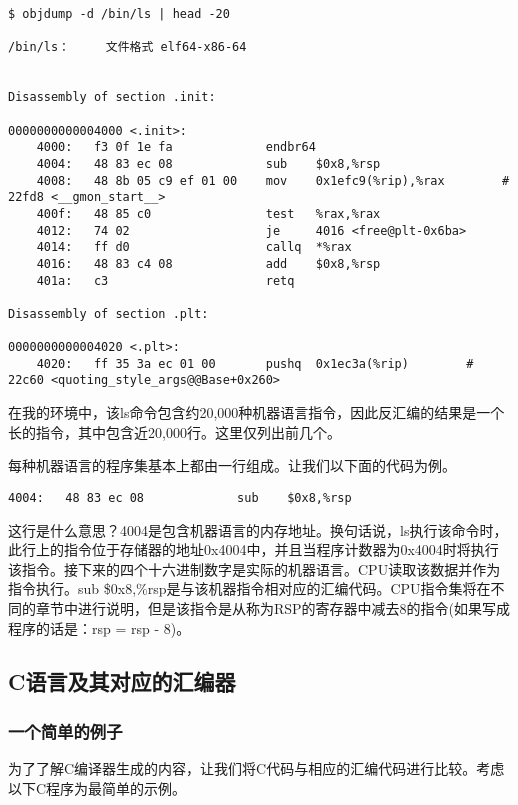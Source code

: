 \documentclass[cn,10pt,math=newtx,citestyle=gb7714-2015,bibstyle=gb7714-2015]{elegantbook}
\begin{document}
\begin{verbatim}
$ objdump -d /bin/ls | head -20

/bin/ls：     文件格式 elf64-x86-64


Disassembly of section .init:

0000000000004000 <.init>:
    4000:   f3 0f 1e fa             endbr64 
    4004:   48 83 ec 08             sub    $0x8,%rsp
    4008:   48 8b 05 c9 ef 01 00    mov    0x1efc9(%rip),%rax        # 22fd8 <__gmon_start__>
    400f:   48 85 c0                test   %rax,%rax
    4012:   74 02                   je     4016 <free@plt-0x6ba>
    4014:   ff d0                   callq  *%rax
    4016:   48 83 c4 08             add    $0x8,%rsp
    401a:   c3                      retq   

Disassembly of section .plt:

0000000000004020 <.plt>:
    4020:   ff 35 3a ec 01 00       pushq  0x1ec3a(%rip)        # 22c60 <quoting_style_args@@Base+0x260>
\end{verbatim}

在我的环境中，该ls命令包含约20,000种机器语言指令，因此反汇编的结果是一个长的指令，其中包含近20,000行。这里仅列出前几个。

每种机器语言的程序集基本上都由一行组成。让我们以下面的代码为例。

\begin{verbatim}
4004:   48 83 ec 08             sub    $0x8,%rsp
\end{verbatim}

这行是什么意思？4004是包含机器语言的内存地址。换句话说，ls执行该命令时，此行上的指令位于存储器的地址0x4004中，并且当程序计数器为0x4004时将执行该指令。接下来的四个十六进制数字是实际的机器语言。CPU读取该数据并作为指令执行。sub \$0x8,\%rsp是与该机器指令相对应的汇编代码。CPU指令集将在不同的章节中进行说明，但是该指令是从称为RSP的寄存器中减去8的指令(如果写成程序的话是：rsp = rsp - 8)。

\subsection{C语言及其对应的汇编器}

\subsubsection{一个简单的例子}

为了了解C编译器生成的内容，让我们将C代码与相应的汇编代码进行比较。考虑以下C程序为最简单的示例。
\end{document}
